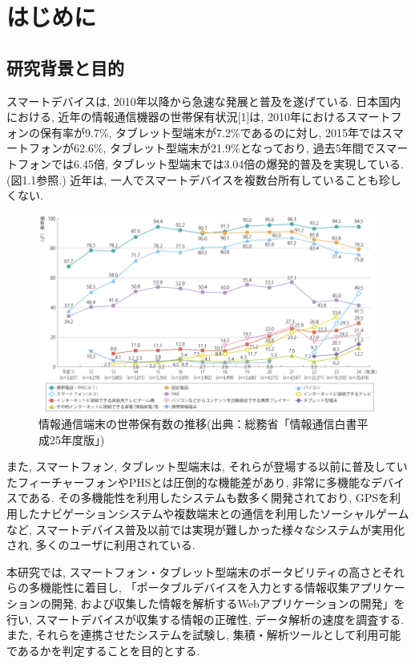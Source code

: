 \chapter{はじめに}
\label{chap:introduction}

\section{研究背景と目的}
スマートデバイスは, 2010年以降から急速な発展と普及を遂げている.
日本国内における, 近年の情報通信機器の世帯保有状況[1]は, 2010年におけるスマートフォンの保有率が9.7\%, タブレット型端末が7.2\%であるのに対し, 2015年ではスマートフォンが62.6\%, タブレット型端末が21.9\%となっており, 過去5年間でスマートフォンでは6.45倍, タブレット型端末では3.04倍の爆発的普及を実現している.(図1.1参照.)
近年は, 一人でスマートデバイスを複数台所有していることも珍しくない.

\begin{figure}
\begin{center}
\includegraphics[width=16cm]{fig/n4301010.png}
\end{center}
\caption{情報通信端末の世帯保有数の推移(出典：総務省「情報通信白書平成25年度版」)}
\end{figure}

また, スマートフォン, タブレット型端末は, それらが登場する以前に普及していたフィーチャーフォンやPHSとは圧倒的な機能差があり, 非常に多機能なデバイスである.
その多機能性を利用したシステムも数多く開発されており, GPSを利用したナビゲーションシステムや複数端末との通信を利用したソーシャルゲームなど, スマートデバイス普及以前では実現が難しかった様々なシステムが実用化され, 多くのユーザに利用されている.

本研究では, スマートフォン・タブレット型端末のポータビリティの高さとそれらの多機能性に着目し, 「ポータブルデバイスを入力とする情報収集アプリケーションの開発, および収集した情報を解析するWebアプリケーションの開発」を行い, スマートデバイスが収集する情報の正確性, データ解析の速度を調査する.
また, それらを連携させたシステムを試験し, 集積・解析ツールとして利用可能であるかを判定することを目的とする.

